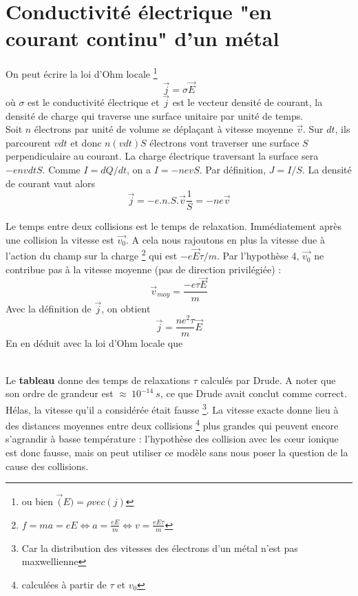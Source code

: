 \section{Conductivité électrique "en courant continu" d'un métal}
On peut écrire la loi d'Ohm locale \footnote{ou bien $\vec(E) = \rho vec(j)$} 
\begin{equation}
	\vec{j} = \sigma\vec{E}
\end{equation}
où $\sigma$ est le conductivité électrique et $\vec{j}$ est le vecteur densité de 
courant, la densité de charge qui traverse une surface unitaire par unité de temps.\\

Soit $n$ électrons par unité de volume se déplaçant à vitesse moyenne $\vec{v}$. Sur 
$dt$, ils parcourent $vdt$ et donc $n(vdt)S$ électrons vont traverser une surface $S$ 
perpendiculaire au courant. La charge électrique traversant la surface sera $-envdtS$.
Comme $I = dQ/dt$, on a $I = -nevS$. Par définition, $J = I/S$. La densité de courant 
vaut alors
\begin{equation}
	\vec j = -e.n.S.\vec v\frac{1}{S} = -ne\vec{v}
\end{equation}

Le temps entre deux collisions est le temps de relaxation. Immédiatement après une collision 
la vitesse est $\vec{v_0}$. A cela nous rajoutons en plus la vitesse due à l'action du champ
sur la charge \footnote{$f = ma = eE \Leftrightarrow a = \frac{eE}{m} \Leftrightarrow
	v = \frac{eE\tau }{m}$} qui est $-e\vec{E}\tau/m$.
Par l'hypothèse 4, $\vec{v_0}$ ne contribue pas à la vitesse moyenne (pas de direction privilégiée) :
\begin{equation}
	\vec{v}_{moy} = \dfrac{-e\tau\vec E}{m}
\end{equation}
Avec la définition de $\vec j$, on obtient
\begin{equation}
	\vec j = \dfrac{ne^2\tau}{m}\vec{E}
\end{equation}
En en déduit avec la loi d'Ohm locale que\\
\


Le \textbf{tableau} donne des temps de relaxations $\tau$ calculés par Drude. A noter 
que son ordre de grandeur est $\approx\ 10^{-14}\ s$, ce que Drude avait conclut comme 
correct.  Hélas, la vitesse qu'il a considérée était fausse \footnote{Car la distribution 
des vitesses des électrons d'un métal n'est pas maxwellienne}. La vitesse exacte donne 
lieu à des distances moyennes entre deux collisions \footnote{calculées à partir de $\tau$
et $v_0$} plus grandes qui peuvent encore s’agrandir à basse température : l’hypothèse
des collision avec les cœur ionique est donc fausse, mais on peut utiliser  ce modèle
sans nous poser la question de la cause des collisions.

